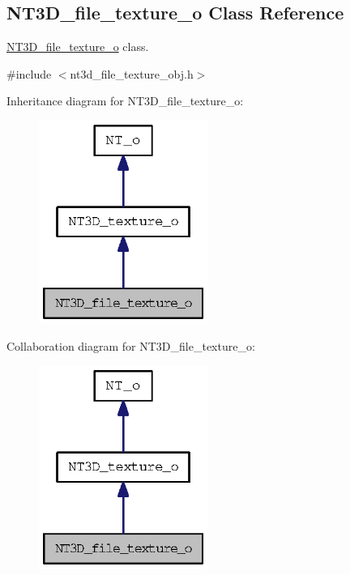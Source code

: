 \subsection{NT3D\_\-file\_\-texture\_\-o Class Reference}
\label{class_n_t3_d__file__texture__o}


\hyperlink{class_n_t3_d__file__texture__o}{NT3D\_\-file\_\-texture\_\-o} class.  




{\ttfamily \#include $<$nt3d\_\-file\_\-texture\_\-obj.h$>$}



Inheritance diagram for NT3D\_\-file\_\-texture\_\-o:
\nopagebreak
\begin{figure}[H]
\begin{center}
\leavevmode
\includegraphics[width=156pt]{class_n_t3_d__file__texture__o__inherit__graph}
\end{center}
\end{figure}


Collaboration diagram for NT3D\_\-file\_\-texture\_\-o:
\nopagebreak
\begin{figure}[H]
\begin{center}
\leavevmode
\includegraphics[width=156pt]{class_n_t3_d__file__texture__o__coll__graph}
\end{center}
\end{figure}
